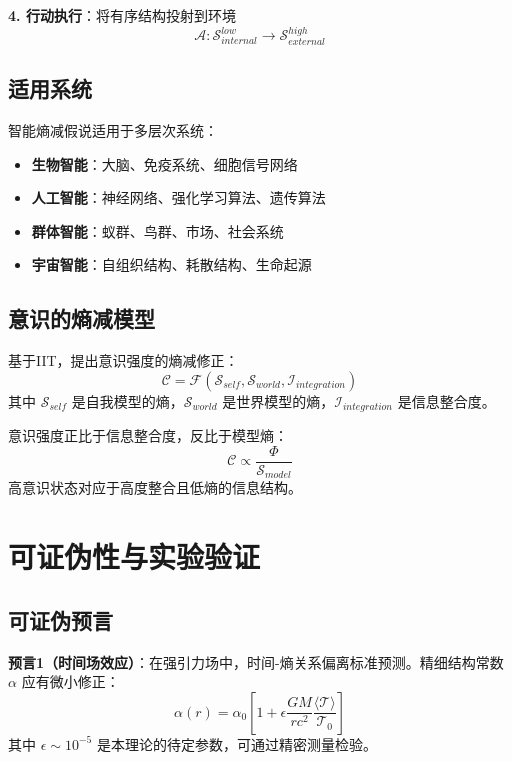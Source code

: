 \documentclass[12pt,a4paper]{article}
\begin{document}
\textbf{4. 行动执行}：将有序结构投射到环境
\begin{equation}
\mathcal{A}: \mathcal{S}_{internal}^{low} \to \mathcal{S}_{external}^{high}
\end{equation}

\subsection{适用系统}

智能熵减假说适用于多层次系统：
\begin{itemize}
\item \textbf{生物智能}：大脑、免疫系统、细胞信号网络
\item \textbf{人工智能}：神经网络、强化学习算法、遗传算法
\item \textbf{群体智能}：蚁群、鸟群、市场、社会系统
\item \textbf{宇宙智能}：自组织结构、耗散结构、生命起源
\end{itemize}

\subsection{意识的熵减模型}

基于IIT，提出意识强度的熵减修正：
\begin{equation}
\mathcal{C} = \mathcal{F}(\mathcal{S}_{self}, \mathcal{S}_{world}, \mathcal{I}_{integration})
\end{equation}
其中 $\mathcal{S}_{self}$ 是自我模型的熵，$\mathcal{S}_{world}$ 是世界模型的熵，$\mathcal{I}_{integration}$ 是信息整合度。

意识强度正比于信息整合度，反比于模型熵：
\begin{equation}
\mathcal{C} \propto \frac{\Phi}{\mathcal{S}_{model}}
\end{equation}
高意识状态对应于高度整合且低熵的信息结构。

\section{可证伪性与实验验证}

\subsection{可证伪预言}

\textbf{预言1（时间场效应）}：在强引力场中，时间-熵关系偏离标准预测。精细结构常数 $\alpha$ 应有微小修正：
\begin{equation}
\alpha(r) = \alpha_0 \left[1 + \epsilon \frac{GM}{rc^2} \frac{\langle \mathcal{T} \rangle}{\mathcal{T}_0}\right]
\end{equation}
其中 $\epsilon \sim 10^{-5}$ 是本理论的待定参数，可通过精密测量检验。
\end{document}
